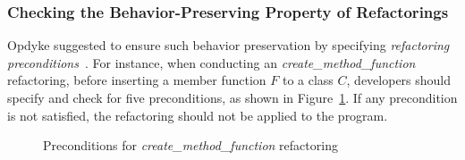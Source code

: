 \documentclass[runningheads,a4paper]{llncs}
\begin{document}
\subsubsection{Checking the Behavior-Preserving Property of Refactorings}Opdyke suggested to ensure such behavior preservation by specifying \emph{refactoring preconditions}~\cite{Opdyke1992:ROF}. For instance, when conducting an \emph{create\_method\_function} refactoring, before inserting a member function $F$ to a class $C$, developers should specify and check for five preconditions, as shown in Figure~\ref{fig:preconditions}. If any precondition is not satisfied, the refactoring should not be applied to the program.

\begin{figure}[!htb]
\centering
{}
\caption{Preconditions for \emph{create\_method\_function} refactoring~\cite{Opdyke1992:ROF}}
\label{fig:preconditions}
\end{figure}
\end{document}
